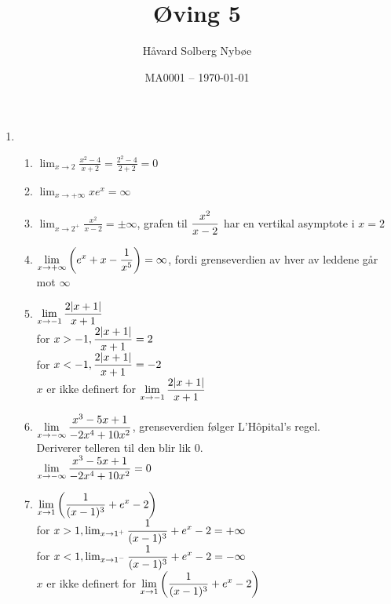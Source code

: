 \documentclass[a4paper, 12pt]{article}  %
\title{Øving 5}                         %
\author{Håvard Solberg Nybøe}           %
\date{MA0001 -- \today}                 %
\begin{document}
\maketitle

\begin{enumerate}
    \item [\boxed{1}]
          \begin{enumerate}
              \item $\displaystyle \lim_{x\rightarrow 2} \frac{x^2-4}{x+2} = \frac{2^2 - 4}{2+2} = 0$ \\
              \item $\displaystyle \lim_{x\rightarrow +\infty} xe^x = \infty$ \\
              \item $\displaystyle \lim_{x\rightarrow 2^+} \frac{x^2}{x-2} = \pm\infty$, grafen til $\displaystyle{x^2\over x-2}$ har en vertikal asymptote i $x = 2$ \\
              \item $\displaystyle \lim_{x\rightarrow +\infty} \left( e^x + x - {1\over x^5} \right) = \infty$, fordi grenseverdien av hver av leddene går mot $\infty$ \\
              \item $\displaystyle \lim_{x\rightarrow -1} {2|x+1| \over x+1}$ \\
                    for $x > -1, \displaystyle{ 2|x+1| \over x+1} = 2$ \\
                    for $x < -1, \displaystyle{ 2|x+1| \over x+1} = -2$ \\
                    {$x$ er ikke definert for $\displaystyle \lim_{x\rightarrow -1}{ 2|x+1| \over x+1}$} \\
              \item $\displaystyle \lim_{x\rightarrow -\infty} {x^3-5x+1 \over -2x^4 + 10x^2}$, grenseverdien følger L'Hôpital's regel.\\ \newline
                    Deriverer telleren til den blir lik 0. \\ \newline
                    $\displaystyle \lim_{x\rightarrow -\infty} {x^3-5x+1 \over -2x^4 + 10x^2} = 0$ \\ \newline
              \item $\displaystyle \lim_{x\rightarrow 1} \left( {1 \over (x-1)^3} + e^x - 2 \right)$ \\
                    for $x > 1, \lim_{x\rightarrow 1^+} \displaystyle{1 \over (x-1)^3} + e^x - 2 = +\infty$ \\
                    for $x < 1, \lim_{x\rightarrow 1^-} \displaystyle{1 \over (x-1)^3} + e^x - 2 = -\infty$ \\
                    {$x$ er ikke definert for $\displaystyle \lim_{x\rightarrow 1} \left( {1 \over (x-1)^3} + e^x - 2 \right)$} \\
          \end{enumerate}
\end{enumerate}

\end{document}
